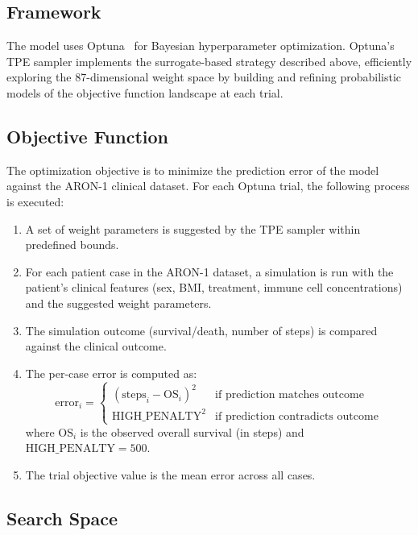\subsection{Framework}

The model uses Optuna~\cite{optuna} for Bayesian hyperparameter optimization. Optuna's TPE sampler implements the surrogate-based strategy described above, efficiently exploring the 87-dimensional weight space by building and refining probabilistic models of the objective function landscape at each trial.

\subsection{Objective Function}

The optimization objective is to minimize the prediction error of the model against the ARON-1 clinical dataset. For each Optuna trial, the following process is executed:

\begin{enumerate}
    \item A set of weight parameters is suggested by the TPE sampler within predefined bounds.
    \item For each patient case in the ARON-1 dataset, a simulation is run with the patient's clinical features (sex, BMI, treatment, immune cell concentrations) and the suggested weight parameters.
    \item The simulation outcome (survival/death, number of steps) is compared against the clinical outcome.
    \item The per-case error is computed as:
    \begin{equation*}
        \text{error}_i = \begin{cases}
            (\text{steps}_i - \text{OS}_i)^2 & \text{if prediction matches outcome} \\
            \text{HIGH\_PENALTY}^2 & \text{if prediction contradicts outcome}
        \end{cases}
    \end{equation*}
    where $\text{OS}_i$ is the observed overall survival (in steps) and $\text{HIGH\_PENALTY} = 500$.
    \item The trial objective value is the mean error across all cases.
\end{enumerate}

\subsection{Search Space}


